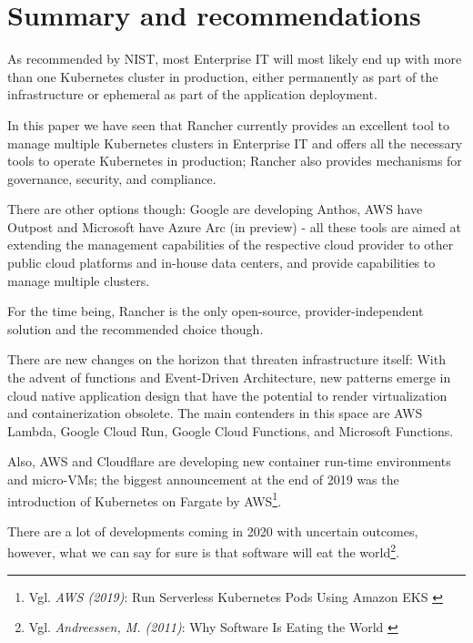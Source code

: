 %
%

\pagebreak
\section{Summary and recommendations}

\onehalfspacing

As recommended by NIST, most Enterprise IT will most likely end up with more than one Kubernetes cluster in production, either permanently as part of the infrastructure or ephemeral as part of the application deployment.

In this paper we have seen that Rancher currently provides an excellent tool to manage multiple Kubernetes clusters in Enterprise IT and offers all the necessary tools to operate Kubernetes in production; Rancher also provides mechanisms for governance, security, and compliance.

There are other options though: Google are developing Anthos, AWS have Outpost and Microsoft have Azure Arc (in preview) - all these tools are aimed at extending the management capabilities of the respective cloud provider to other public cloud platforms and in-house data centers, and provide capabilities to manage multiple clusters.

For the time being, Rancher is the only open-source, provider-independent solution and the recommended choice though.

There are new changes on the horizon that threaten infrastructure itself: With the advent of functions and Event-Driven Architecture, new patterns emerge in cloud native application design that have the potential to render virtualization and containerization obsolete. The main contenders in this space are AWS Lambda, Google Cloud Run, Google Cloud Functions, and Microsoft Functions.

Also, AWS and Cloudflare are developing new container run-time environments and micro-VMs; the biggest announcement at the end of 2019 was the introduction of Kubernetes on Fargate by AWS\footnote{Vgl. \textit{AWS (2019)}: Run Serverless Kubernetes Pods Using Amazon EKS \cite{eksFargate}}.

There are a lot of developments coming in 2020 with uncertain outcomes, however, what we can say for sure is that software will eat the world\footnote{Vgl. \textit{Andreessen, M. (2011)}: Why Software Is Eating the World \cite{softwareEats}}.
